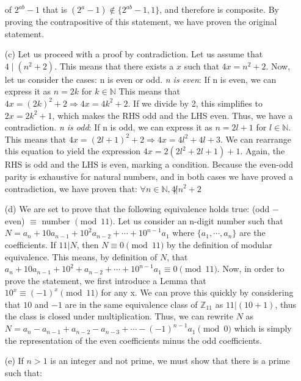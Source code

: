 \documentclass[11pt]{article}
\begin{document}
\begin{itemize}
    of $2^{ab} -1$ that is $(2^{a} -1) \not \in \{2^{ab} -1 , 1\}$, and therefore is composite. 
    By proving the contrapositive of this statement, we have proven the original statement.
  \item[(c)]
    Let us proceed with a proof by contradiction. Let us assume that $4 \mid (n^{2} + 2)$. This
    means that there exists a $x$ such that $4x = n^{2} +2$. Now, let us consider the
    cases: n is even or odd. 
    \newline \textit{n is even}: If n is even, we can express it as $n=2k$ for $k\in \mathbb{N}$
    This means that $4x = (2k)^{2} +2 \Rightarrow 4x = 4k^{2} +2$. If we divide by 2, this
    simplifies to $2x = 2k^{2} +1$, which makes the RHS odd and the LHS even.
    Thus, we have a contradiction.
    \newline \textit{n is odd}: If n is odd, we can express it as $n=2l +1$ for $l \in \mathbb{N}$.
    This means that $4x = (2l+1)^{2} +2 \Rightarrow 4x = 4l^{2} + 4l + 3$. We can rearrange this
    equation to yield the expression $4x  = 2(2l^{2} + 2l + 1) +1$. Again, the RHS is odd and the 
    LHS is even, marking a condition.
    \newline Because the even-odd parity is exhaustive for natural numbers, and in both cases
    we have proved a contradiction, we have proven that: $\forall n \in \mathbb{N}, 
    4 \not| n^{2} + 2$
  \item[(d)]
    We are set to prove that the following equivalence holds true: (odd $-$ even) $\equiv$ number 
    $\pmod{11}$. Let us consider an n-digit number such that $ N = a_{n} + 10a_{n-1} + 10^{2}
    a_{n-2} + \cdots + 10^{n-1}a_{1}$ where $\{ a_{1}, \cdots, a_{n}\}$ are the coefficients. If
    $ 11 | N$, then $N \equiv 0 \pmod{11}$ by the definition of modular equivalence. This means,
    by definition of $N$, that  $a_{n} + 10a_{n-1} + 10^{2}+  a_{n-2} + \cdots + 10^{n-1}a_{1} 
    \equiv 0 \pmod{11}$. Now, in order to prove the statement, we first introduce a Lemma that 
    $10^{x} \equiv (-1)^{x} \pmod {11}$ for any x. We can prove this quickly by considering that 
    $10$ and $-1$ are in the same equivalence class of $\mathbb{Z}_{11}$ as $11 | (10 + 1)$, thus 
    the class is closed under multiplication. Thus, we can rewrite $N$ as 
    $ N = a_{n} - a_{n-1} + a_{n-2} - a_{n-3} + \cdots - (-1)^{n-1}a_{1} \pmod{0}$ which is simply
    the representation of the even coefficients minus the odd coefficients.\cite{AOPS}
  \item[(e)] 
    If $n > 1$ is an integer and not prime, we must show that there is a prime such that:

\end{itemize}
\end{document}
